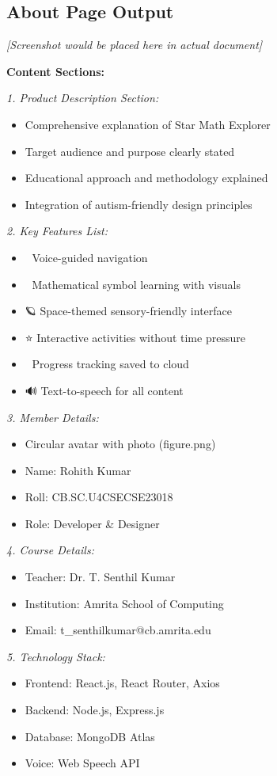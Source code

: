 \documentclass[12pt, a4paper]{article}
\begin{document}
\subsection{About Page Output}

\begin{tcolorbox}[colback=gray!5, colframe=gray!50, title=\textbf{About and Documentation Page}]
\textit{[Screenshot would be placed here in actual document]}

\textbf{Content Sections:}

\textit{1. Product Description Section:}
\begin{itemize}
    \item Comprehensive explanation of Star Math Explorer
    \item Target audience and purpose clearly stated
    \item Educational approach and methodology explained
    \item Integration of autism-friendly design principles
\end{itemize}

\textit{2. Key Features List:}
\begin{itemize}
    \item 🚀 Voice-guided navigation
    \item 🌟 Mathematical symbol learning with visuals
    \item 🪐 Space-themed sensory-friendly interface
    \item ⭐ Interactive activities without time pressure
    \item 🌙 Progress tracking saved to cloud
    \item 🔊 Text-to-speech for all content
\end{itemize}

\textit{3. Member Details:}
\begin{itemize}
    \item Circular avatar with photo (figure.png)
    \item Name: Rohith Kumar
    \item Roll: CB.SC.U4CSECSE23018
    \item Role: Developer \& Designer
\end{itemize}

\textit{4. Course Details:}
\begin{itemize}
    \item Teacher: Dr. T. Senthil Kumar
    \item Institution: Amrita School of Computing
    \item Email: t\_senthilkumar@cb.amrita.edu
\end{itemize}

\textit{5. Technology Stack:}
\begin{itemize}
    \item Frontend: React.js, React Router, Axios
    \item Backend: Node.js, Express.js
    \item Database: MongoDB Atlas
    \item Voice: Web Speech API
\end{itemize}
\end{tcolorbox}
\end{document}
